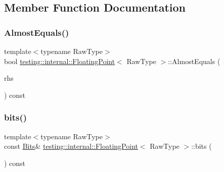 \subsection{Member Function Documentation}
\mbox{\label{classtesting_1_1internal_1_1FloatingPoint_a965214c1af2f9ac5adb1393794aa81e5}} 
\subsubsection{\texorpdfstring{AlmostEquals()}{AlmostEquals()}}
{\footnotesize\ttfamily template$<$typename Raw\+Type$>$ \\
bool \mbox{\hyperlink{classtesting_1_1internal_1_1FloatingPoint}{testing\+::internal\+::\+Floating\+Point}}$<$ Raw\+Type $>$\+::Almost\+Equals (\begin{DoxyParamCaption}\item[{const \mbox{\hyperlink{classtesting_1_1internal_1_1FloatingPoint}{Floating\+Point}}$<$ Raw\+Type $>$ \&}]{rhs }\end{DoxyParamCaption}) const\hspace{0.3cm}{\ttfamily [inline]}}

\mbox{\label{classtesting_1_1internal_1_1FloatingPoint_aab053be914bdc9e507c0db89740c318c}} 
\subsubsection{\texorpdfstring{bits()}{bits()}}
{\footnotesize\ttfamily template$<$typename Raw\+Type$>$ \\
const \mbox{\hyperlink{classtesting_1_1internal_1_1FloatingPoint_abf228bf6cd48f12c8b44c85b4971a731}{Bits}}\& \mbox{\hyperlink{classtesting_1_1internal_1_1FloatingPoint}{testing\+::internal\+::\+Floating\+Point}}$<$ Raw\+Type $>$\+::bits (\begin{DoxyParamCaption}{ }\end{DoxyParamCaption}) const\hspace{0.3cm}{\ttfamily [inline]}}

